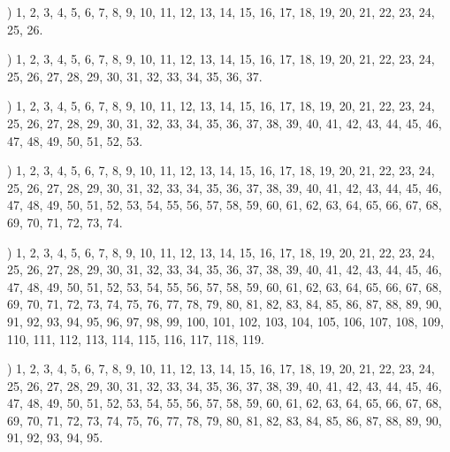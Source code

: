 \documentclass[a4paper,11pt]{article}
\begin{document}


\noindent
{}) 1, 2, 3, 4, 5, 6, 7, 8, 9, 10, 11, 12, 13, 14, 15, 16,
17, 18, 19, 20, 21, 22, 23, 24, 25, 26.

\vspace{\spaceFour}



\noindent
{}) 1, 2, 3, 4, 5, 6, 7, 8, 9, 10, 11, 12, 13, 14, 15, 16,
17, 18, 19, 20, 21, 22, 23, 24, 25, 26, 27, 28, 29, 30, 31, 32, 33,
34, 35, 36, 37.

\vspace{\spaceFour}



\noindent
{}) 1, 2, 3, 4, 5, 6, 7, 8, 9, 10, 11, 12, 13, 14, 15, 16,
17, 18, 19, 20, 21, 22, 23, 24, 25, 26, 27, 28, 29, 30, 31, 32, 33,
34, 35, 36, 37, 38, 39, 40, 41, 42, 43, 44, 45, 46, 47, 48, 49, 50,
51, 52, 53.

\vspace{\spaceFour}



\noindent
{}) 1, 2, 3, 4, 5, 6, 7, 8, 9, 10, 11, 12, 13, 14, 15, 16,
17, 18, 19, 20, 21, 22, 23, 24, 25, 26, 27, 28, 29, 30, 31, 32, 33,
34, 35, 36, 37, 38, 39, 40, 41, 42, 43, 44, 45, 46, 47, 48, 49, 50,
51, 52, 53, 54, 55, 56, 57, 58, 59, 60, 61, 62, 63, 64, 65, 66, 67,
68, 69, 70, 71, 72, 73, 74.

\vspace{\spaceFour}



\noindent
{}) 1, 2, 3, 4, 5, 6, 7, 8, 9, 10, 11, 12, 13, 14, 15, 16,
17, 18, 19, 20, 21, 22, 23, 24, 25, 26, 27, 28, 29, 30, 31, 32, 33, 34,
35, 36, 37, 38, 39, 40, 41, 42, 43, 44, 45, 46, 47, 48, 49, 50, 51, 52,
53, 54, 55, 56, 57, 58, 59, 60, 61, 62, 63, 64, 65, 66, 67, 68, 69, 70,
71, 72, 73, 74, 75, 76, 77, 78, 79, 80, 81, 82, 83, 84, 85, 86, 87, 88,
89, 90, 91, 92, 93, 94, 95, 96, 97, 98, 99, 100, 101, 102, 103, 104, 105,
106, 107, 108, 109, 110, 111, 112, 113, 114, 115, 116, 117, 118, 119.

\vspace{\spaceFour}



\noindent
{}) 1, 2, 3, 4, 5, 6, 7, 8, 9, 10, 11, 12, 13, 14, 15, 16,
17, 18, 19, 20, 21, 22, 23, 24, 25, 26, 27, 28, 29, 30, 31, 32, 33, 34,
35, 36, 37, 38, 39, 40, 41, 42, 43, 44, 45, 46, 47, 48, 49, 50, 51, 52,
53, 54, 55, 56, 57, 58, 59, 60, 61, 62, 63, 64, 65, 66, 67, 68, 69, 70,
71, 72, 73, 74, 75, 76, 77, 78, 79, 80, 81, 82, 83, 84, 85, 86, 87, 88,
89, 90, 91, 92, 93, 94, 95.
\end{document}
